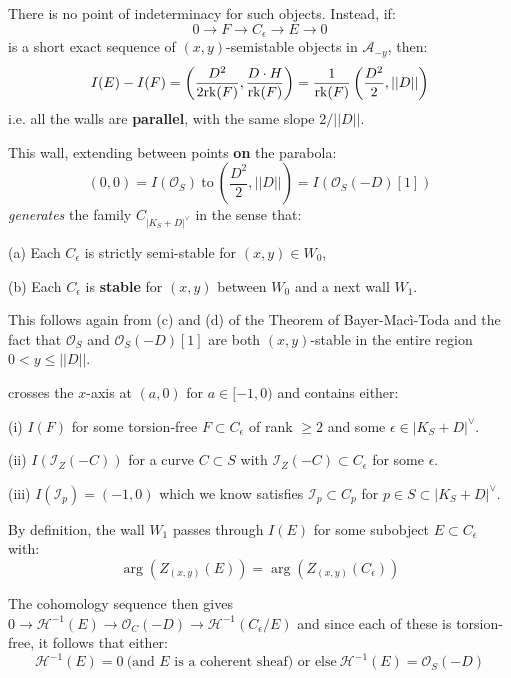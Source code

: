 \documentclass{amsart}
\begin{document}
There is no point of indeterminacy for such objects. Instead, if: 
\[ 0 \rightarrow F \rightarrow C_\epsilon \rightarrow E \rightarrow 0 \] 
is a short exact sequence of $(x,y)$-semistable objects in ${\mathcal A}_{-y}$, then: 
\[ I(E) - I(F) = \left( \frac{D^2}{2\mbox{rk}(F)}, \frac{D \cdot H}{\mbox{rk}(F)}\right) = \frac 1{\mbox{rk}(F)} \left( \frac{D^2}{2}, {||D||} \right)  \] 
i.e. all the walls are {\bf parallel}, with the same slope
$2/{||D||}$.

\medskip 

 This wall, extending between points {\bf on} the parabola: 
\[ (0,0) = I({\mathcal O}_S) \ \mbox{to} \ \left( \frac{D^2}2, ||D||  \right) = I({\mathcal O}_S(-D)[1])  \] 
{\it generates} the family $C_{|K_S + D|^\vee}$ in the sense that: 

\medskip

(a) Each $C_\epsilon$ is strictly semi-stable for $(x,y) \in W_0$, 

\medskip

(b) Each $C_\epsilon$ is {\bf stable} for $(x,y)$ between $W_0$ and a next wall $W_1$.  

\medskip

This follows again from (c) and (d) of the Theorem of Bayer-Mac\`i-Toda and the fact that 
${\mathcal O}_S$ and ${\mathcal O}_S(-D)[1]$ are both $(x,y)$-stable in the entire region
$0 < y \le ||D||$. 

\medskip

 crosses the $x$-axis at $(a,0)$ for $a \in [-1,0)$ and contains either: 

\medskip

(i) $I(F)$ for some torsion-free $F \subset C_\epsilon$ of rank $\ge 2$ and some $\epsilon \in |K_S + D|^\vee$. 

\medskip

(ii) $I({\mathcal I}_Z(-C))$ for a curve $C \subset S$ with ${\mathcal I}_Z(-C) \subset C_\epsilon$ for some $\epsilon$. 
 
 \medskip
 
 (iii) $I({\mathcal I}_p) = (-1,0)$ which we know satisfies ${\mathcal I}_p \subset C_p$ for $p\in S \subset |K_S + D|^\vee$. 

\medskip

By definition, the wall $W_1$ passes through $I(E)$ for some subobject $E \subset C_\epsilon$ with:
\[ \arg(Z_{(x,y)}(E)) = \arg(Z_{(x,y)}(C_\epsilon)) \] 

The cohomology sequence  then gives
$0 \rightarrow {\mathcal H}^{-1}(E) \rightarrow {\mathcal O}_C(-D) \rightarrow {\mathcal H}^{-1}(C_\epsilon/E)$
and since each of these is torsion-free, it follows that either: 
\[ {\mathcal H}^{-1}(E) = 0 \ \mbox{(and $E$ is a coherent sheaf) or else} \ {\mathcal H}^{-1}(E) = {\mathcal O}_S(-D) \] 
\end{document}
